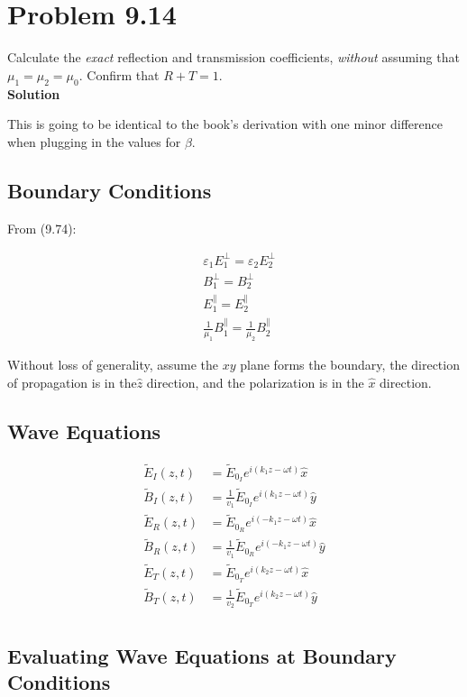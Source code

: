 \documentclass[12pt]{article}
\newcommand{\enterProblemHeader}[1]{
	\rhead{#1}
}
\newenvironment{homeworkProblem}[1]{
    \section{Problem #1}
    \enterProblemHeader{#1}
}{
	\pagebreak
}
\newcommand{\solution}{\textbf{\large Solution}}
\begin{document}
\begin{homeworkProblem}{9.14}
	Calculate the \emph{exact} reflection and transmission coefficients,
	\emph{without} assuming that $\mu_1 = \mu_2 = \mu_0$. Confirm that $R + T =
	1$.\\

	\solution

	This is going to be identical to the book's derivation with one minor
	difference when plugging in the values for $\beta$.

	\subsection{Boundary Conditions}

	From (9.74):

	\begin{align}
		&\varepsilon_1 E_1^\perp = \varepsilon_2 E_2^\perp\\
		&B_1^\perp = B_2^\perp\\
		&E_1^\parallel = E_2^\parallel\\
		&\frac 1 {\mu_1} B_1^\parallel = \frac 1 {\mu_2} B_2^\parallel
	\end{align}

	Without loss of generality, assume the $xy$ plane forms the boundary, the
	direction of propagation is in the$\hat z$ direction, and the polarization
	is in the $\hat x$ direction.

	\subsection{Wave Equations}

	\begin{align*}
		\tilde E_I (z, t) &= \tilde E_{0_I} e^{i (k_1 z - \omega t)} \hat x\\
		\tilde B_I (z, t) &= \frac 1 {v_1} \tilde E_{0_I} e^{i (k_1 z - \omega
		t)} \hat y\\
		\tilde E_R (z, t) &= \tilde E_{0_R} e^{i (-k_1 z - \omega t)} \hat x\\
		\tilde B_R (z, t) &= \frac 1 {v_1} \tilde E_{0_R} e^{i (-k_1 z - \omega
		t)} \hat y\\
		\tilde E_T (z, t) &= \tilde E_{0_T} e^{i (k_2 z - \omega t)} \hat x\\
		\tilde B_T (z, t) &= \frac 1 {v_2} \tilde E_{0_T} e^{i (k_2 z - \omega
		t)} \hat y\\
	\end{align*}

	\subsection{Evaluating Wave Equations at Boundary Conditions}


\end{homeworkProblem}
\end{document}
